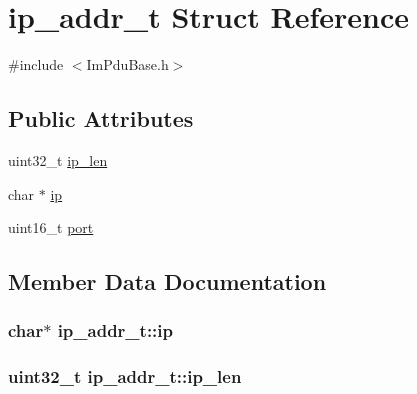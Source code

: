 \hypertarget{structip__addr__t}{}\section{ip\+\_\+addr\+\_\+t Struct Reference}
\label{structip__addr__t}


{\ttfamily \#include $<$Im\+Pdu\+Base.\+h$>$}

\subsection*{Public Attributes}
\begin{DoxyCompactItemize}
\item 
uint32\+\_\+t \hyperlink{structip__addr__t_a8418b859ebb0830b5c8fa79887854ea1}{ip\+\_\+len}
\item 
char $\ast$ \hyperlink{structip__addr__t_a1154fb6ae225cd2dacc5b2518cfde567}{ip}
\item 
uint16\+\_\+t \hyperlink{structip__addr__t_a26a6b3b56225b809b62e97ee9693fe65}{port}
\end{DoxyCompactItemize}


\subsection{Member Data Documentation}
\hypertarget{structip__addr__t_a1154fb6ae225cd2dacc5b2518cfde567}{}
\subsubsection[{ip}]{\setlength{\rightskip}{0pt plus 5cm}char$\ast$ ip\+\_\+addr\+\_\+t\+::ip}\label{structip__addr__t_a1154fb6ae225cd2dacc5b2518cfde567}
\hypertarget{structip__addr__t_a8418b859ebb0830b5c8fa79887854ea1}{}
\subsubsection[{ip\+\_\+len}]{\setlength{\rightskip}{0pt plus 5cm}uint32\+\_\+t ip\+\_\+addr\+\_\+t\+::ip\+\_\+len}\label{structip__addr__t_a8418b859ebb0830b5c8fa79887854ea1}
\hypertarget{structip__addr__t_a26a6b3b56225b809b62e97ee9693fe65}{}

